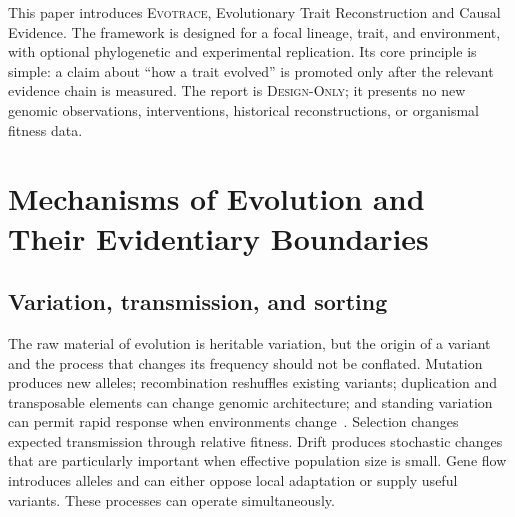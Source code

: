 \documentclass[conference]{IEEEtran}
\newcommand{\evotrace}{\textsc{Evotrace}}
\newcommand{\designonly}{\textsc{Design-Only}}
\begin{document}
This paper introduces \evotrace{}, Evolutionary Trait Reconstruction and Causal Evidence. The framework is designed for a focal lineage, trait, and environment, with optional phylogenetic and experimental replication. Its core principle is simple: a claim about ``how a trait evolved'' is promoted only after the relevant evidence chain is measured. The report is \designonly{}; it presents no new genomic observations, interventions, historical reconstructions, or organismal fitness data.

\section{Mechanisms of Evolution and Their Evidentiary Boundaries}

\subsection{Variation, transmission, and sorting}

The raw material of evolution is heritable variation, but the origin of a variant and the process that changes its frequency should not be conflated. Mutation produces new alleles; recombination reshuffles existing variants; duplication and transposable elements can change genomic architecture; and standing variation can permit rapid response when environments change~\cite{barrettschluter2008,kaessmann2010}. Selection changes expected transmission through relative fitness. Drift produces stochastic changes that are particularly important when effective population size is small. Gene flow introduces alleles and can either oppose local adaptation or supply useful variants. These processes can operate simultaneously.
\end{document}
